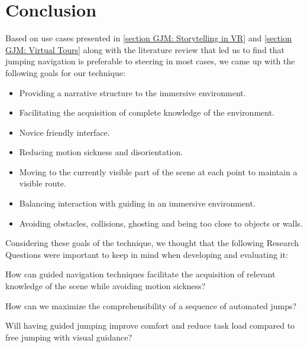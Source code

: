 \section{Conclusion}
\label{section GJM: Conclusion}
Based on use cases presented in \cref{section GJM: Storytelling in VR} and \cref{section GJM: Virtual Tours} along with the literature review that led us to find that jumping navigation is preferable to steering in most cases, we came up with the following goals for our technique:
\begin{itemize}
	\item Providing a narrative structure to the immersive environment.
	\item Facilitating the acquisition of complete knowledge of the environment.
	\item Novice friendly interface.
	\item Reducing motion sickness and disorientation.
	\item Moving to the currently visible part of the scene at each point to maintain a visible route.
	\item Balancing interaction with guiding in an immersive environment.
	\item Avoiding obstacles, collisions, ghosting and being too close to objects or walls.
\end{itemize}
Considering these goals of the technique, we thought that the following Research Questions were important to keep in mind when developing and evaluating it: 
\begin{researchq}
	\label{rq:rq1}
	How can guided navigation techniques facilitate the acquisition of relevant knowledge of the scene while avoiding motion sickness?
\end{researchq}
\begin{researchq}
	\label{rq:rq2}
	How can we maximize the comprehensibility of a sequence of automated jumps?
\end{researchq}
\begin{researchq}
	\label{rq:rq3}
	Will having guided jumping improve comfort and reduce task load compared to free jumping with visual guidance?
\end{researchq}

